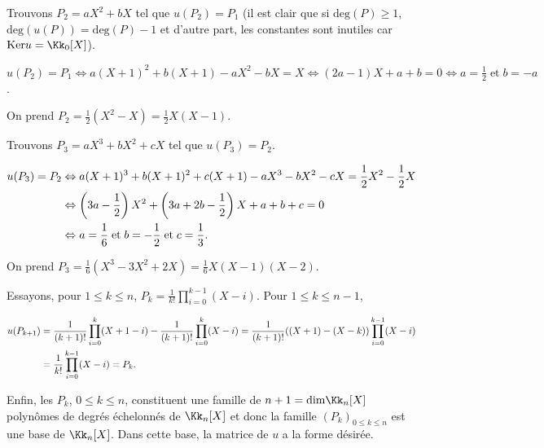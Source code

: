 {\begin{enumerate}
{Trouvons $P_2=aX^2 + bX$ tel que $u(P_2) = P_1$ (il est clair que si $\text{deg}(P)\geqslant1$, $\text{deg}(u(P))=\text{deg}(P)-1$ et d'autre part, les constantes sont inutiles car $\text{Ker}u=\Kk_0[X]$).

\begin{center}
$u(P_2) =P_1\Leftrightarrow a(X+1)^2 +b(X+1) - aX^2 - bX =X\Leftrightarrow (2a-1)X +a+b =0\Leftrightarrow a =\frac{1}{2}\;\text{et}\;b = -a$.
\end{center}

On prend $P_2=\frac{1}{2}(X^2-X)=\frac{1}{2}X(X-1)$.

Trouvons $P_3=aX^3 + bX^2+cX$ tel que $u(P_3) = P_2$.

\begin{align*}\ensuremath
u(P_3) =P_2&\Leftrightarrow a(X+1)^3 +b(X+1)^2+c(X+1) - aX^3 - bX^2-cX =\frac{1}{2}X^2-\frac{1}{2}X\\
 &\Leftrightarrow \left(3a-\frac{1}{2}\right)X^2+\left(3a+2b-\frac{1}{2}\right)X+a+b+c=0\\
 &\Leftrightarrow a =\frac{1}{6}\;\text{et}\;b =-\frac{1}{2}\;\text{et}\;c=\frac{1}{3}.
\end{align*}

On prend $P_3=\frac{1}{6}(X^3-3X^2+2X)=\frac{1}{6}X(X-1)(X-2)$.

Essayons, pour $1\leqslant k\leqslant n$, $P_k=\frac{1}{k!}\prod_{i=0}^{k-1}(X-i)$. Pour $1\leqslant k\leqslant n-1$,

\begin{align*}\ensuremath
u(P_{k+1})&=\frac{1}{(k+1)!}\prod_{i=0}^{k}(X+1-i)-\frac{1}{(k+1)!}\prod_{i=0}^{k}(X-i)=\frac{1}{(k+1)!}((X+1)-(X-k))\prod_{i=0}^{k-1}(X-i)\\
 &=\frac{1}{k!}\prod_{i=0}^{k-1}(X-i)=P_k.
\end{align*}

Enfin, les $P_k$, $0\leqslant k\leqslant n$, constituent une famille de $n+1=\text{dim}\Kk_n[X]$ polynômes de degrés échelonnés de $\Kk_n[X]$ et donc la famille $(P_k)_{0\leqslant k\leqslant n}$ est une base de $\Kk_n[X]$. Dans cette base, la matrice de $u$ a la forme désirée.}
\end{enumerate}
}
